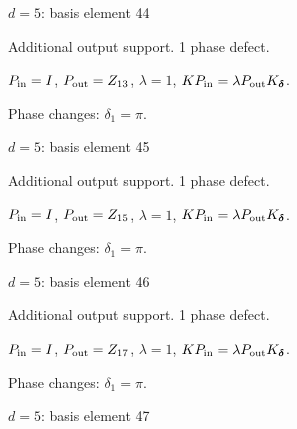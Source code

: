 \vfill
{\footnotesize\texttt{}}
\newpage
{}
{\Large $d=5$: basis element 44}\par
Additional output support. 1 phase defect.
\begin{center}
\end{center}
\vspace{-1mm}
$P_{\rm in}=I$, \quad $P_{\rm out}=Z_{13}$, \quad $\lambda=1$, \qquad $K P_{\rm in}=\lambda P_{\rm out}K_{\boldsymbol\delta}$.
\par\smallskip\begin{minipage}{.98\linewidth}\small Phase changes: $\delta_{1}=\pi$.\end{minipage}
\vfill
{\footnotesize\texttt{}}
\newpage
{}
{\Large $d=5$: basis element 45}\par
Additional output support. 1 phase defect.
\begin{center}
\end{center}
\vspace{-1mm}
$P_{\rm in}=I$, \quad $P_{\rm out}=Z_{15}$, \quad $\lambda=1$, \qquad $K P_{\rm in}=\lambda P_{\rm out}K_{\boldsymbol\delta}$.
\par\smallskip\begin{minipage}{.98\linewidth}\small Phase changes: $\delta_{1}=\pi$.\end{minipage}
\vfill
{\footnotesize\texttt{}}
\newpage
{}
{\Large $d=5$: basis element 46}\par
Additional output support. 1 phase defect.
\begin{center}
\end{center}
\vspace{-1mm}
$P_{\rm in}=I$, \quad $P_{\rm out}=Z_{17}$, \quad $\lambda=1$, \qquad $K P_{\rm in}=\lambda P_{\rm out}K_{\boldsymbol\delta}$.
\par\smallskip\begin{minipage}{.98\linewidth}\small Phase changes: $\delta_{1}=\pi$.\end{minipage}
\vfill
{\footnotesize\texttt{}}
\newpage
{}
{\Large $d=5$: basis element 47}\par
